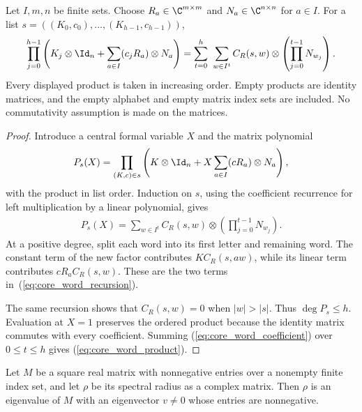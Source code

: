 \begin{lemma}
    \label{thm:core_word_product}
    \leanok
    Let $I,m,n$ be finite sets. Choose
    $R_a\in\C^{m\times m}$ and $N_a\in\C^{n\times n}$ for $a\in I$.
    For a list $s=((K_0,c_0),\ldots,(K_{h-1},c_{h-1}))$,
    \begin{align}
        \prod_{j=0}^{h-1}\left(K_j\otimes \Id_n+
        \sum_{a\in I}(c_jR_a)\otimes N_a\right)
        =\sum_{t=0}^{h}\ \sum_{w\in I^t}
        C_R(s,w)\otimes\left(\prod_{j=0}^{t-1}N_{w_j}\right).
        \label{eq:core_word_product}
    \end{align}
    Every displayed product is taken in increasing order. Empty products are
    identity matrices, and the empty alphabet and empty matrix index sets are
    included. No commutativity assumption is made on the matrices.
\end{lemma}

\begin{proof}\leanok
    Introduce a central formal variable $X$ and the matrix polynomial
    \begin{align}
        P_s(X)=\prod_{(K,c)\in s}
        \left(K\otimes \Id_n+X\sum_{a\in I}(cR_a)\otimes N_a\right),
        \label{eq:core_word_polynomial}
    \end{align}
    with the product in list order. Induction on $s$, using the coefficient
    recurrence for left multiplication by a linear polynomial, gives
    \begin{align}
        [X^t]P_s(X)=\sum_{w\in I^t}C_R(s,w)\otimes
        \left(\prod_{j=0}^{t-1}N_{w_j}\right).
        \label{eq:core_word_coefficient}
    \end{align}
    At a positive degree, split each word into its first letter and remaining
    word. The constant term of the new factor contributes
    $K C_R(s,aw)$, while its linear term contributes $cR_a C_R(s,w)$.
    These are the two terms in~(\ref{eq:core_word_recursion}).

    The same recursion shows that $C_R(s,w)=0$ when $|w|>|s|$. Thus
    $\deg P_s\le h$. Evaluation at $X=1$ preserves the ordered product because
    the identity matrix commutes with every coefficient. Summing
    (\ref{eq:core_word_coefficient}) over $0\le t\le h$ gives
    (\ref{eq:core_word_product}).
\end{proof}

\begin{theorem}
    \label{thm:weak_perron_frobenius}
    \leanok
    Let $M$ be a square real matrix with nonnegative entries over a nonempty
    finite index set, and let $\rho$ be its spectral radius as a complex
    matrix. Then $\rho$ is an eigenvalue of $M$ with an eigenvector $v\ne0$
    whose entries are nonnegative.
\end{theorem}


